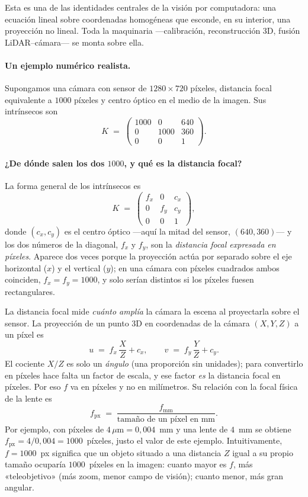 \documentclass[11pt,a4paper]{article}
\begin{document}
Esta es una de las identidades centrales de la visión por computadora: una
ecuación lineal sobre coordenadas homogéneas que esconde, en su
interior, una proyección no lineal. Toda la maquinaria —calibración,
reconstrucción 3D, fusión LiDAR--cámara— se monta sobre ella.

\paragraph{Un ejemplo numérico realista.}
Supongamos una cámara con sensor de $1280\times 720$ píxeles, distancia
focal equivalente a $1000$ píxeles y centro óptico en el medio de la
imagen. Sus intrínsecos son
\[
  K \;=\;
  \begin{pmatrix}
    1000 & 0 & 640 \\
    0 & 1000 & 360 \\
    0 & 0 & 1
  \end{pmatrix}.
\]

\paragraph{¿De dónde salen los dos $1000$, y qué es la distancia focal?}
La forma general de los intrínsecos es
\[
  K \;=\;
  \begin{pmatrix}
    f_x & 0 & c_x \\
    0 & f_y & c_y \\
    0 & 0 & 1
  \end{pmatrix},
\]
donde $(c_x,c_y)$ es el centro óptico —aquí la mitad del sensor,
$(640,360)$— y los dos números de la diagonal, $f_x$ y $f_y$, son la
\emph{distancia focal expresada en píxeles}. Aparece dos veces porque la
proyección actúa por separado sobre el eje horizontal ($x$) y el vertical
($y$); en una cámara con píxeles cuadrados ambos coinciden,
$f_x=f_y=1000$, y solo serían distintos si los píxeles fuesen
rectangulares.

La distancia focal mide \emph{cuánto amplía} la cámara la escena al
proyectarla sobre el sensor. La proyección de un punto $3$D en
coordenadas de la cámara $(X,Y,Z)$ a un píxel es
\[
  u \;=\; f_x\,\frac{X}{Z} + c_x,
  \qquad
  v \;=\; f_y\,\frac{Y}{Z} + c_y .
\]
El cociente $X/Z$ es solo un \emph{ángulo} (una proporción sin unidades);
para convertirlo en píxeles hace falta un factor de escala, y ese factor
\emph{es} la distancia focal en píxeles. Por eso $f$ va en píxeles y no en
milímetros. Su relación con la focal física de la lente es
\[
  f_{\text{px}} \;=\; \frac{f_{\text{mm}}}{\text{tamaño de un píxel en mm}} .
\]
Por ejemplo, con píxeles de $4\,\mu\text{m} = 0{,}004$~mm y una lente de
$4$~mm se obtiene $f_{\text{px}} = 4/0{,}004 = 1000$~píxeles, justo el
valor de este ejemplo. Intuitivamente, $f=1000$~px significa que un
objeto situado a una distancia $Z$ igual a su propio tamaño ocuparía
$1000$~píxeles en la imagen: cuanto mayor es $f$, más «teleobjetivo»
(más zoom, menor campo de visión); cuanto menor, más gran angular.
\end{document}
